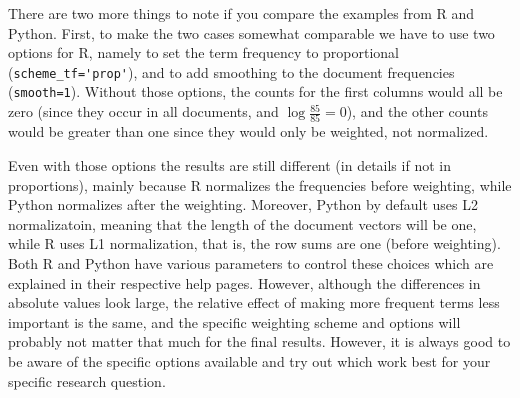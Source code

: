 There are two more things to note if you compare the examples from R and Python.
First, to make the two cases somewhat comparable we have to use two options for R, namely to set the term frequency to proportional (\verb|scheme_tf='prop'|),
and to add smoothing to the document frequencies (\verb|smooth=1|).
Without those options, the counts for the first columns would all be zero (since they occur in all documents, and $\log \frac{85}{85}=0$),
and the other counts would be greater than one since they would only be weighted, not normalized.

Even with those options the results are still different (in details if not in proportions),
mainly because R normalizes the frequencies before weighting, while Python normalizes after the weighting.
Moreover, Python by default uses L2 normalizatoin, meaning that the length of the document vectors will be one,
while R uses L1 normalization, that is, the row sums are one (before weighting).
Both R and Python have various parameters to control these choices which are explained in their respective help pages.
However, although the differences in absolute values look large, the relative effect of making more frequent terms less important is the same,
and the specific weighting scheme and options will probably not matter that much for the final results.
However, it is always good to be aware of the specific options available and try out which work best for your specific research question.




